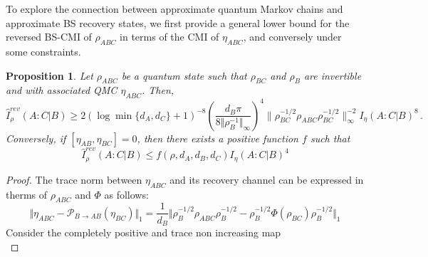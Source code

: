 \documentclass[11pt]{article}
\theoremstyle{newdefinition}
\theoremstyle{newplain}
\newtheorem{proposition}[definition]{Proposition}
\theoremstyle{myplain}
\DeclareMathOperator{\1}{\mathds{1}}
\newcommand{\PCR}[1]{{\color{blue}#1}}
\begin{document}
{
To explore the connection between approximate quantum Markov chains and approximate BS recovery states, we first provide a general lower bound for the reversed BS-CMI of $\rho_{ABC}$ in terms of the CMI of $\eta_{ABC}$, \PCR{and conversely under some constraints.}
\begin{proposition}\label{prop:relation_Irev_I}
Let $\rho_{ABC}$ be a quantum state such that $\rho_{BC}$ and $\rho_B$ are invertible and with associated QMC $\eta_{ABC}$. Then,
\begin{equation}
    \widehat{I}^{rev}_{\rho}(A:C | B)\geq  2 (\log\min\{d_A,d_C\}+1)^{-8}\left( \frac{d_B \pi}{8\Vert \rho_B^{-1}\Vert_{\infty}} \right)^4 \|\rho_{BC}^{-1/2}\rho_{ABC}\rho_{BC}^{-1/2} \|_\infty^{-2}I_{\eta}(A:C\vert B)^8 \, .
\end{equation}
\PCR{Conversely, if $[\eta_{AB},\eta_{BC}]=0$, then  there exists a positive function $f$ such that
\begin{equation}
    \widehat{I}^{rev}_{\rho}(A:C | B)\leq f(\rho,d_A,d_B, d_C)I_{\eta}(A:C\vert B)^4
\end{equation}
}
\begin{comment}
    \begin{equation}
    \begin{split}
           \widehat{I}^{rev}_{\rho}(A:C | B) &\geq \left( \frac{d_B \pi}{8\Vert \rho_B^{-1}\Vert_{\infty}} \right)^4 \|\rho_{BC}^{-1/2}\rho_{ABC}\rho_{BC}^{-1/2} \|_\infty^{-2}\Vert \eta_{ABC}-\mathcal{P}_{B\rightarrow AB}(\eta_{BC})\Vert_1^4\\
           &\geq  2 (\log\min\{d_A,d_C\}+1)^{-8}\left( \frac{d_B \pi}{8\Vert \rho_B^{-1}\Vert_{\infty}} \right)^4 \|\rho_{BC}^{-1/2}\rho_{ABC}\rho_{BC}^{-1/2} \|_\infty^{-2}I_{\eta}(A:C\vert B)^8 \, .
        \end{split}
    \end{equation}
\end{comment}
\end{proposition}
\begin{proof}
The trace norm between $\eta_{ABC}$ and its recovery channel can be expressed in therms of $\rho_{ABC}$ and $\Phi$ as follows:
    \begin{equation}
            \Vert \eta_{ABC}-\mathcal{P}_{B\rightarrow AB}(\eta_{BC})\Vert_1 
             = \frac{1}{d_B}\Vert \rho_B^{-1/2}\rho_{ABC}\rho_B^{-1/2} -\rho_B^{-1/2}\Phi(\rho_{BC})\rho_B^{-1/2}\Vert_1
    \end{equation}
    Consider the completely positive and trace non increasing map \begin{equation}

\end{equation}
\end{proof}}
\end{document}
